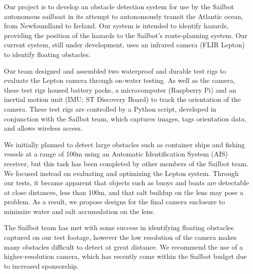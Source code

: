 Our project is to develop an obstacle detection system for use by the Sailbot autonomous sailboat in its attempt to autonomously transit the Atlantic ocean, from Newfoundland to Ireland. Our system is intended to identify hazards, providing the position of the hazards to the Sailbot's route-planning system. Our current system, still under development, uses an infrared camera (FLIR Lepton) to identify floating obstacles.

Our team designed and assembled two waterproof and durable test rigs to evaluate the Lepton camera through on-water testing. As well as the camera, these test rigs housed battery packs, a microcomputer (Raspberry Pi) and an inertial motion unit (IMU; ST Discovery Board) to track the orientation of the camera. These test rigs are controlled by a Python script, developed in conjunction with the Sailbot team, which captures images, tags orientation data, and allows wireless access.

We initially planned to detect large obstacles such as container ships and fishing vessels at a range of 100m using an Automatic Identification System (AIS) receiver, but this task has been completed by other members of the Sailbot team. We focused instead on evaluating and optimizing the Lepton system. Through our tests, it became apparent that objects such as buoys and boats are detectable at close distances, less than 100m, and that salt buildup on the lens may pose a problem. As a result, we propose designs for the final camera enclosure to minimize water and salt accumulation on the lens.

The Sailbot team has met with some success in identifying floating obstacles captured on our test footage, however the low resolution of the camera makes many obstacles difficult to detect at great distance. We recommend the use of a higher-resolution camera, which has recently come within the Sailbot budget due to increased sponsorship.
